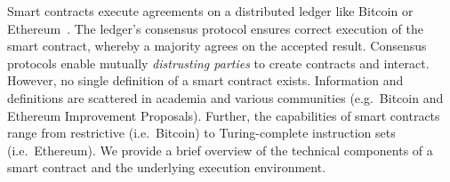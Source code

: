 Smart contracts execute agreements on a distributed ledger like Bitcoin or Ethereum~\cite{Nakamoto2008,Buterin2013}.
The ledger's consensus protocol ensures correct execution of the smart contract, whereby a majority agrees on the accepted result.
Consensus protocols enable mutually \emph{distrusting parties} to create contracts and interact.
However, no single definition of a smart contract exists.
Information and definitions are scattered in academia and various communities (e.g.\ Bitcoin and Ethereum Improvement Proposals).
Further, the capabilities of smart contracts range from restrictive (i.e.\ Bitcoin) to Turing-complete instruction sets (i.e.\ Ethereum). 
We provide a brief overview of the technical components of a smart contract and the underlying execution environment.

